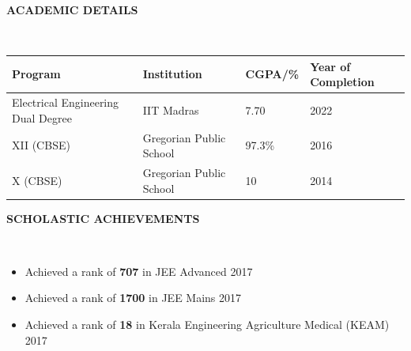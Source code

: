 \documentclass[a4paper,8pt]{article}
\newcommand{\lsep}{-0.5cm}
\newcommand{\resheading}[1]{{\small \colorbox{mygrey}{\begin{minipage}{0.975\textwidth}{\textbf{#1 \vphantom{p\^{E}}}}\end{minipage}}}}
\begin{document}
\resheading{\textbf{ACADEMIC DETAILS} }\\[\lsep]
\vspace{3mm}
\begin{center}
\hspace{6mm}
\begin{tabu} to 0.94\textwidth { | X[c] | X[c] | X[c] | X[c] | }
    \hline
    \vspace{1pt}
    \textbf{Program} \vspace{1pt}
    & \vspace{1pt}
 \textbf{Institution}\vspace{1pt}
 & \vspace{1pt} \textbf{CGPA/\%} \vspace{1pt}
 & \vspace{1pt} \textbf{Year of Completion} \vspace{1pt}
 
   \\ \hline
   
   \vspace{1pt} Electrical Engineering \newline Dual Degree \vspace{5pt} & \vspace{5pt}IIT Madras & \vspace{5pt}7.70 & \vspace{5pt}2022 \\
   \hline
   \vspace{1pt} XII (CBSE)  & \vspace{1pt} \thinspace Gregorian Public School \vspace{10pt} & \vspace{1pt} 97.3\% &\vspace{1pt} 2016 \\
   \hline
   \vspace{1pt} X (CBSE) &  \vspace{1pt}\thinspace Gregorian Public School \vspace{10pt} & \vspace{1pt} 10 &\vspace{1pt}  2014 \\
   \hline

\end{tabu}
\end{center}

\resheading{\textbf{SCHOLASTIC ACHIEVEMENTS} }\\[\lsep]
\vspace{0.6mm}
\begin{itemize}
    \item Achieved a rank of \textbf{707} in JEE Advanced 2017
    \item Achieved a rank of \textbf{1700} in JEE Mains 2017
    \item Achieved a rank of \textbf{18} in Kerala Engineering Agriculture Medical (KEAM) 2017  
\end{itemize}
\end{document}
